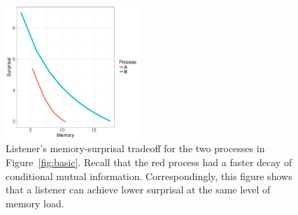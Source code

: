 \begin{figure}
\includegraphics[width=0.45\textwidth]{figures/listener-tradeoff.pdf}
	\caption{Listener's memory-surprisal tradeoff for the two processes in Figure~\ref{fig:basic}. Recall that the red process had a faster decay of conditional mutual information. Correspondingly, this figure shows that a listener can achieve lower surprisal at the same level of memory load.}\label{fig:listener-tradeoff}
\end{figure}






